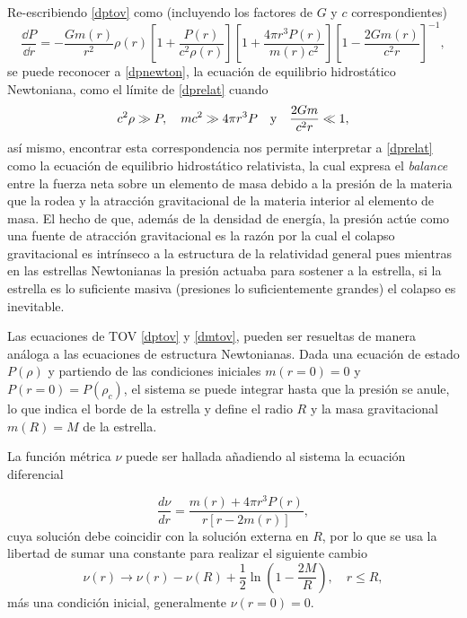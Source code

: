 Re-escribiendo \eqref{dptov} como (incluyendo los factores de $G$ y $c$ correspondientes)
\begin{equation}
    \frac { \dd P } { \dd r } =  - \frac { G  m ( r ) } { r ^ { 2 } } \rho ( r ) \left[ 1 + \frac { P ( r ) } {c ^ { 2 } \rho ( r ) } \right] \left[ 1 + \frac { 4 \pi r ^ { 3 } P ( r ) } { m ( r ) c ^ { 2 } } \right]  \left[ 1 - \frac { 2 G m ( r ) } { c ^ { 2 } r } \right] ^ { - 1 }, 
    \label{dprelat}
\end{equation}
se puede reconocer a \eqref{dpnewton}, la ecuación de equilibrio hidrostático Newtoniana, como el límite de \eqref{dprelat} cuando 
\begin{equation}
    c^2\rho \gg P \qc mc^2 \gg 4\pi r^3P \quad \text{y} \quad  \frac{2Gm}{c^2r}\ll 1,
\end{equation}
así mismo, encontrar esta correspondencia nos permite interpretar a \eqref{dprelat} como la ecuación de equilibrio hidrostático relativista, la cual expresa el \textit{balance} entre la fuerza neta sobre un elemento de masa debido a la presión de la materia que la rodea y la atracción gravitacional de la materia interior al elemento de masa. El hecho de que, además de la densidad de energía, la presión actúe como una fuente de atracción gravitacional es la razón por la cual el colapso gravitacional es intrínseco a la estructura de la relatividad general pues mientras en las estrellas Newtonianas la presión actuaba para sostener a la estrella, si la estrella es lo suficiente masiva (presiones lo suficientemente grandes) el colapso es inevitable.

Las ecuaciones de TOV \eqref{dptov} y \eqref{dmtov}, pueden ser resueltas de manera análoga a las ecuaciones de estructura Newtonianas. Dada una ecuación de estado $P(\rho)$ y partiendo de las condiciones iniciales $m(r=0)=0$ y $P(r=0)=P(\rho_c)$, el sistema se puede integrar hasta que la presión se anule, lo que indica el borde de la estrella y define el radio $R$ y la masa gravitacional $m(R)=M$ de la estrella. 

La función métrica $\nu$ puede ser hallada añadiendo al sistema la ecuación diferencial

\begin{equation}
    \frac { d \nu } { d r } = \frac { m ( r ) + 4 \pi r ^ { 3 } P ( r ) } { r [ r - 2 m ( r ) ] },
\end{equation}
cuya solución debe coincidir con la solución externa en $R$, por lo que se usa la libertad de sumar una constante para realizar el siguiente cambio
\begin{equation}
    \nu ( r ) \longrightarrow \nu ( r ) - \nu ( R ) + \frac { 1 } { 2 } \ln \left( 1 - \frac { 2 M } { R } \right) , \quad r \leq R,
\end{equation}
más una condición inicial, generalmente $\nu(r=0)=0$.




